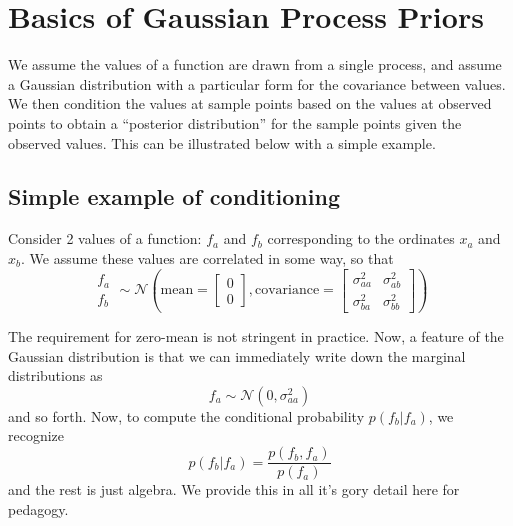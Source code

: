 \documentclass{article}
\begin{document}
\section*{Basics of Gaussian Process Priors}

We assume the values of a function are drawn from a single process, and assume a Gaussian distribution with a particular form for the covariance between values. 
We then condition the values at sample points based on the values at observed points to obtain a ``posterior distribution'' for the sample points given the observed values.
This can be illustrated below with a simple example.

\subsection*{Simple example of conditioning}

Consider 2 values of a function: $f_a$ and $f_b$ corresponding to the ordinates $x_a$ and $x_b$.
We assume these values are correlated in some way, so that
\begin{equation}
\begin{matrix}
f_a \\ 
f_b
\end{matrix}
\sim
\mathcal{N} \left(
\mathrm{mean}=
\begin{bmatrix}
0 \\
0
\end{bmatrix}
,
\mathrm{covariance}=
\begin{bmatrix}
\sigma_{aa}^2 & \sigma^2_{ab} \\
\sigma_{ba}^2 & \sigma^2_{bb}
\end{bmatrix}
\right)
\end{equation}

The requirement for zero-mean is not stringent in practice. 
Now, a feature of the Gaussian distribution is that we can immediately write down the marginal distributions as
\begin{equation}
f_a \sim \mathcal{N}\left(0, \sigma_{aa}^2\right)
\end{equation}
and so forth. 
Now, to compute the conditional probability $p(f_b|f_a)$, we recognize
\begin{equation}
p(f_b|f_a) = \frac{p(f_b, f_a)}{p(f_a)}
\end{equation}
and the rest is just algebra.
We provide this in all it's gory detail here for pedagogy.
\end{document}
